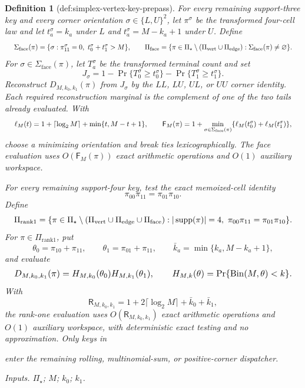 \documentclass{article}
\newtheorem{definition}{Definition}
\begin{document}
\begin{definition}[def:simplex-vertex-key-prepass]
For every remaining support-three key and every corner orientation \(\sigma\in\{L,U\}^2\), let \(\pi^\sigma\) be the transformed four-cell law and let \(t_a^\sigma=k_a\) under \(L\) and \(t_a^\sigma=M-k_a+1\) under \(U\). Define
\[
\makebox[\linewidth][c]{\resizebox{0.98\linewidth}{!}{\(\displaystyle \Sigma_{\mathrm{face}}(\pi)=
\{\sigma:\pi^\sigma_{11}=0,\ t_0^\sigma+t_1^\sigma>M\},
\qquad
\Pi_{\mathrm{face}}=
\{\pi\in\Pi_\star\setminus(\Pi_{\mathrm{vert}}\cup\Pi_{\mathrm{edge}}):
\Sigma_{\mathrm{face}}(\pi)\ne\varnothing\}.\)}}
\]
For \(\sigma\in\Sigma_{\mathrm{face}}(\pi)\), let \(T_a^\sigma\) be the transformed terminal count and set
\[
J_\sigma=
1-\Pr\{T_0^\sigma\ge t_0^\sigma\}
 -\Pr\{T_1^\sigma\ge t_1^\sigma\}.
\]
Reconstruct \(D_{M,k_0,k_1}(\pi)\) from \(J_\sigma\) by the \(LL\), \(LU\), \(UL\), or \(UU\) corner identity. Each required reconstruction marginal is the complement of one of the two tails already evaluated. With
\[
\makebox[\linewidth][c]{\resizebox{0.98\linewidth}{!}{\(\displaystyle \ell_M(t)=1+\lceil\log_2 M\rceil+\min\{t,M-t+1\},
\qquad
\mathsf F_M(\pi)=1+
\min_{\sigma\in\Sigma_{\mathrm{face}}(\pi)}
\{\ell_M(t_0^\sigma)+\ell_M(t_1^\sigma)\},\)}}
\]
choose a minimizing orientation and break ties lexicographically. The face evaluation uses \(O(\mathsf F_M(\pi))\) exact arithmetic operations and \(O(1)\) auxiliary workspace.

For every remaining support-four key, test the exact memoized-cell identity
\[
\pi_{00}\pi_{11}=\pi_{01}\pi_{10}.
\]
Define
\[
\makebox[\linewidth][c]{\resizebox{0.98\linewidth}{!}{\(\displaystyle \Pi_{\mathrm{rank1}}=
\{\pi\in\Pi_\star\setminus
(\Pi_{\mathrm{vert}}\cup\Pi_{\mathrm{edge}}\cup\Pi_{\mathrm{face}}):
|\operatorname{supp}(\pi)|=4,\ 
\pi_{00}\pi_{11}=\pi_{01}\pi_{10}\}.\)}}
\]
For \(\pi\in\Pi_{\mathrm{rank1}}\), put
\[
\theta_0=\pi_{10}+\pi_{11},\qquad
\theta_1=\pi_{01}+\pi_{11},\qquad
\bar k_a=\min\{k_a,M-k_a+1\},
\]
and evaluate
\[
\makebox[\linewidth][c]{\resizebox{0.98\linewidth}{!}{\(\displaystyle D_{M,k_0,k_1}(\pi)=
H_{M,k_0}(\theta_0)H_{M,k_1}(\theta_1),
\qquad
H_{M,k}(\theta)=\Pr\{\operatorname{Bin}(M,\theta)<k\}.\)}}
\]
With
\[
\mathsf R_{M,k_0,k_1}
=1+2\lceil\log_2M\rceil+\bar k_0+\bar k_1,
\]
the rank-one evaluation uses \(O(\mathsf R_{M,k_0,k_1})\) exact arithmetic operations and \(O(1)\) auxiliary workspace, with deterministic exact testing and no approximation. Only keys in
\par\noindent {}\par\noindent
enter the remaining rolling, multinomial-sum, or positive-corner dispatcher.
\par\smallskip\noindent\emph{Inputs.} \(\Pi_\star\); \(M\); \(k_0\); \(k_1\).
\end{definition}
\end{document}
